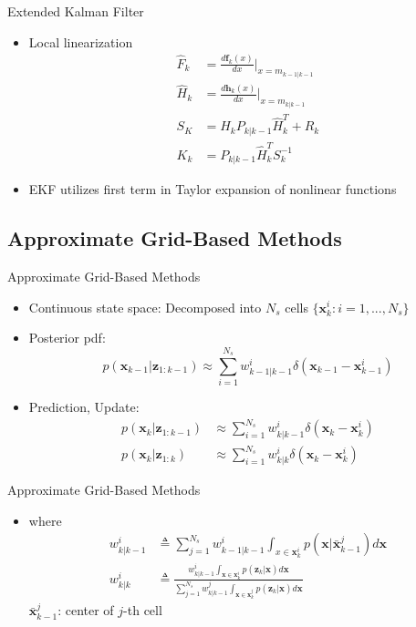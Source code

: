 \documentclass{beamer}
\newcommand{\x}{\mathbf{x}}
\newcommand{\z}{\mathbf{z}}
\begin{document}
\begin{frame}{Extended Kalman Filter}%
  \begin{itemize}
  
  	\item {Local linearization
    	 \begin{align*}
        \hat{F}_k &= \frac{d\mathbf{f}_k(x)}{dx}\Bigr|_{x=m_{k-1|k-1}} \\
        \hat{H}_k &= \frac{d\mathbf{h}_k(x)}{dx}\Bigr|_{x=m_{k|k-1}} \\
      S_K &= \hat{H}_kP_{k|k-1}\hat{H}_k^T + R_k \\
      K_k &= P_{k|k-1}\hat{H}_k^TS_k^{-1}
  \end{align*}
  }
  \item{EKF utilizes first term in Taylor expansion of nonlinear functions
  }
  \end{itemize}
\end{frame}


\subsection{Approximate Grid-Based Methods}

\begin{frame}{Approximate Grid-Based Methods}%
  \begin{itemize}
  	\item {Continuous state space: Decomposed into $N_s$ cells $\{\x_k^i: i=1, ..., N_s\}$
    }
    \item{Posterior pdf:
   		 $$
        p(\mathbf{x}_{k-1}|\mathbf{z}_{1:k-1}) \approx \sum_{i=1}^{N_s} 
        w_{k-1|k-1}^{i} \delta(\mathbf{x}_{k-1} - \mathbf{x}_{k-1}^i)
    	$$ 
    }
  	\item{Prediction, Update:
  		\begin{align*}
        	p(\x_k|\z_{1:k-1}) &\approx \sum_{i=1}^{N_s}w_{k|k-1}^{i}\delta(\x_k - \x_k^i) \\
        	p(\x_k|\z_{1:k})   &\approx \sum_{i=1}^{N_s}w_{k|k}^{i}\delta(\x_k - \x_k^i)        
    	\end{align*}
    
  	}
  \end{itemize}
\end{frame}

\begin{frame}{Approximate Grid-Based Methods}%
  \begin{itemize}
  \item {where
     \begin{align*}
        w_{k|k-1}^{i} &\triangleq \sum_{j=1}^{N_s} w_{k-1|k-1}^{i} \int_{x\in\x_k^i} p(\x|\bar{\x}_{k-1}^j) d\x\\
        w_{k|k}^{i}   &\triangleq \frac{w_{k|k-1}^{i} \displaystyle{\int}_{\x \in \x_k^i} p(\z_k|\x)d\x}
        {\sum\limits_{j=1}^{N_s} w_{k|k-1}^{j}
        \displaystyle{\int}_{\x\in\x_k^j}p(\z_k|\x)d\x}
    \end{align*}
    $\bar{\x}_{k-1}^{j}$: center of $j$-th cell
  }
  \end{itemize}
\end{frame}
\end{document}

